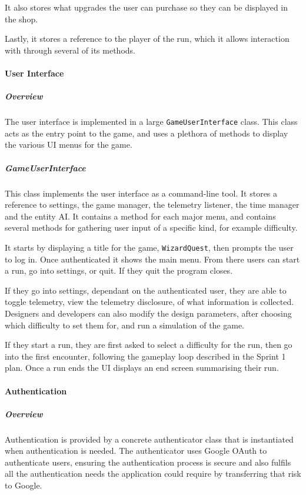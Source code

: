 It also stores what upgrades the user can purchase so they can be displayed in the shop.

Lastly, it stores a reference to the player of the run, which it allows interaction with through several of its methods.

\paragraph{User Interface}

\subparagraph{Overview}
The user interface is implemented in a large \texttt{GameUserInterface} class. This class acts as the entry point to the game, and uses a plethora of methods to display the various UI menus for the game.

\subparagraph{GameUserInterface}
This class implements the user interface as a command-line tool. It stores a reference to settings, the game manager, the telemetry listener, the time manager and the entity AI. It contains a method for each major menu, and contains several methods for gathering user input of a specific kind, for example difficulty.

It starts by displaying a title for the game, \texttt{WizardQuest}, then prompts the user to log in. Once authenticated it shows the main menu. From there users can start a run, go into settings, or quit. If they quit the program closes.

If they go into settings, dependant on the authenticated user, they are able to toggle telemetry, view the telemetry disclosure, of what information is collected. Designers and developers can also modify the design parameters, after choosing which difficulty to set them for, and run a simulation of the game.

If they start a run, they are first asked to select a difficulty for the run, then go into the first encounter, following the gameplay loop described in the Sprint 1 plan. Once a run ends the UI displays an end screen summarising their run.

\paragraph{Authentication}

\subparagraph{Overview}
Authentication is provided by a concrete authenticator class that is instantiated when authentication is needed. The authenticator uses Google OAuth to authenticate users, ensuring the authentication process is secure and also fulfils all the authentication needs the application could require by transferring that risk to Google.

